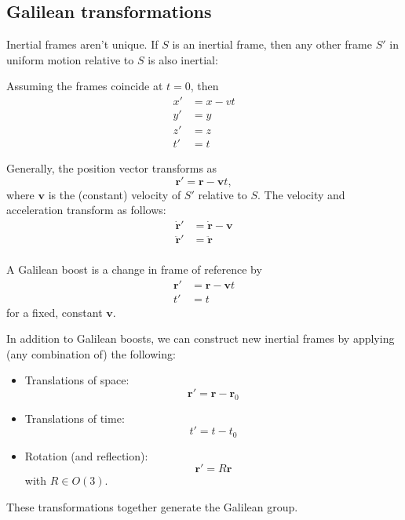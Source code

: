 \documentclass[a4paper]{article}
\begin{document}
\subsection{Galilean transformations}
Inertial frames aren't unique. If $S$ is an inertial frame, then any other frame $S'$ in uniform motion relative to $S$ is also inertial:
\begin{center}
\end{center}

Assuming the frames coincide at $t = 0$, then
\begin{align*}
  x' &= x - vt\\
  y' &= y\\
  z' &= z\\
  t' &= t
\end{align*}

Generally, the position vector transforms as
\[
  \mathbf{r}' = \mathbf{r} - \mathbf{v}t,
\]
where $\mathbf{v}$ is the (constant) velocity of $S'$ relative to $S$. The velocity and acceleration transform as follows:
\begin{align*}
  \dot{\mathbf{r}}' &= \dot{\mathbf{r}} - \mathbf{v}\\
  \ddot{\mathbf{r}}' &= \ddot{\mathbf{r}}\\
\end{align*}

\begin{defi}
  A Galilean boost is a change in frame of reference by
  \begin{align*}
    \mathbf{r}' &= \mathbf{r} - \mathbf{v}t\\
    t' &= t
  \end{align*}
  for a fixed, constant $\mathbf{v}$.
\end{defi}

In addition to Galilean boosts, we can construct new inertial frames by applying (any combination of) the following:
\begin{itemize}
  \item Translations of space:
    \[
      \mathbf{r}' = \mathbf{r} - \mathbf{r}_0
    \]
  \item Translations of time:
    \[
      t' = t - t_0
    \]
  \item Rotation (and reflection):
    \[
      \mathbf{r}' = R\mathbf{r}
    \]
    with $R\in O(3)$.
\end{itemize}
These transformations together generate the Galilean group.
\end{document}
